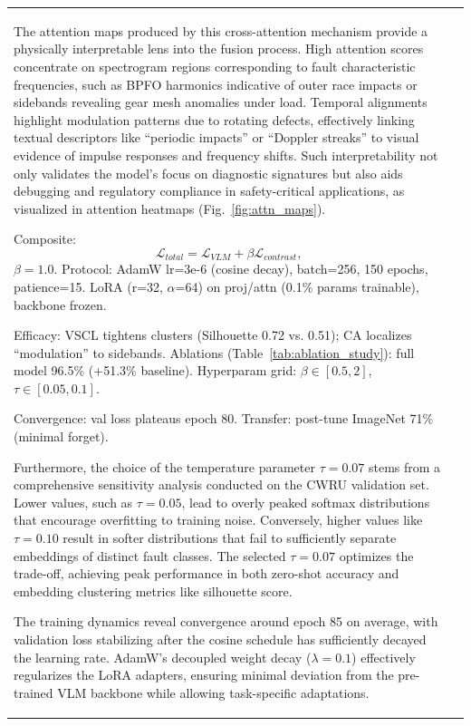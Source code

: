 \begin{table}[htbp]
\begin{tabular}{@{}ll@{}}
\begin{table}[htbp]
The attention maps produced by this cross-attention mechanism provide a physically interpretable lens into the fusion process. High attention scores concentrate on spectrogram regions corresponding to fault characteristic frequencies, such as BPFO harmonics indicative of outer race impacts or sidebands revealing gear mesh anomalies under load. Temporal alignments highlight modulation patterns due to rotating defects, effectively linking textual descriptors like ``periodic impacts'' or ``Doppler streaks'' to visual evidence of impulse responses and frequency shifts. Such interpretability not only validates the model's focus on diagnostic signatures but also aids debugging and regulatory compliance in safety-critical applications, as visualized in attention heatmaps (Fig.~\ref{fig:attn_maps}).

Composite:
\begin{equation}
\mathcal{L}_{total} = \mathcal{L}_{VLM} + \beta \mathcal{L}_{contrast},
\label{eq:f6}
\end{equation}
$\beta=1.0$. Protocol: AdamW lr=3e-6 (cosine decay), batch=256, 150 epochs, patience=15. LoRA (r=32, $\alpha$=64) on proj/attn (0.1\% params trainable), backbone frozen.

Efficacy: VSCL tightens clusters (Silhouette 0.72 vs. 0.51); CA localizes ``modulation'' to sidebands. Ablations (Table~\ref{tab:ablation_study}): full model 96.5\% (+51.3\% baseline). Hyperparam grid: $\beta\in[0.5,2]$, $\tau\in[0.05,0.1]$.

Convergence: val loss plateaus epoch 80. Transfer: post-tune ImageNet 71\% (minimal forget).

Furthermore, the choice of the temperature parameter $\tau = 0.07$ stems from a comprehensive sensitivity analysis conducted on the CWRU validation set. Lower values, such as $\tau = 0.05$, lead to overly peaked softmax distributions that encourage overfitting to training noise. Conversely, higher values like $\tau = 0.10$ result in softer distributions that fail to sufficiently separate embeddings of distinct fault classes. The selected $\tau = 0.07$ optimizes the trade-off, achieving peak performance in both zero-shot accuracy and embedding clustering metrics like silhouette score.

The training dynamics reveal convergence around epoch 85 on average, with validation loss stabilizing after the cosine schedule has sufficiently decayed the learning rate. AdamW's decoupled weight decay ($\lambda=0.1$) effectively regularizes the LoRA adapters, ensuring minimal deviation from the pre-trained VLM backbone while allowing task-specific adaptations.


\end{table}
\end{tabular}
\end{table}
